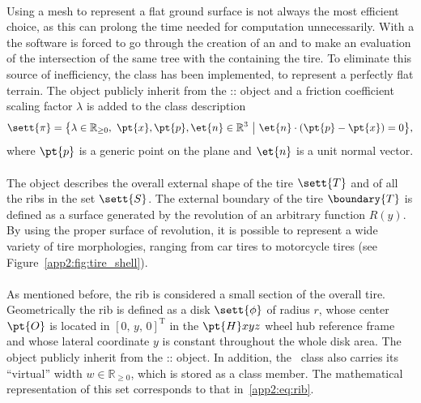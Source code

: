 \paragraph{\Flat{}}
Using a mesh to represent a flat ground surface is not always the most efficient choice, as this can prolong the time needed for computation unnecessarily. With a \Mesh{} the software is forced to go through the creation of an \AabbTree{} and to make an evaluation of the intersection of the same tree with the \Aabb{} containing the tire. To eliminate this source of inefficiency, the \Flat{} class has been implemented, to represent a perfectly flat terrain. The \Flat{} object publicly inherit from the \Acme{}::\Plane{} object and a friction coefficient scaling factor $\lambda$ is added to the class description
%
\begin{equation*}
  \sett{\pi} = \big\{ \lambda \in \mathbb{R}_{\geq 0}, ~ \pt{x},\pt{p},\et{n} \in \mathbb{R}^3 ~ \big\lvert ~ \et{n} \cdot (\pt{p} - \pt{x}) = 0\big\}
  \text{,}
\end{equation*}
%
where $\pt{p}$ is a generic point on the plane and $\et{n}$ is a unit normal vector.

\paragraph{\Shape{}}
The \Shape{} object describes the overall external shape of the tire $\sett{T}$ and of all the ribs in the set $\sett{S}$. The external boundary of the tire $\boundary{T}$ is defined as a surface generated by the revolution of an arbitrary function $R(y)$. By using the proper surface of revolution, it is possible to represent a wide variety of tire morphologies, ranging from car tires to motorcycle tires (see Figure~\ref{app2:fig:tire_shell}).

\paragraph{\Rib{}}
As mentioned before, the rib is considered a small section of the overall tire. Geometrically the rib is defined as a disk $\sett{\phi}$ of radius $r$, whose center $\pt{O}$ is located in $[0, \, y, \, 0]^\mathrm{T}$ in the $\pt{H}xyz$ wheel hub reference frame and whose lateral coordinate $y$ is constant throughout the whole disk area. The~\Rib{} object publicly inherit from the \Acme{}::\Disk{} object. In addition, the~\Rib{} class also carries its ``virtual'' width $w \in \mathbb{R}_{\geq 0}$, which is stored as a class member. The mathematical representation of this set corresponds to that in~\eqref{app2:eq:rib}.


